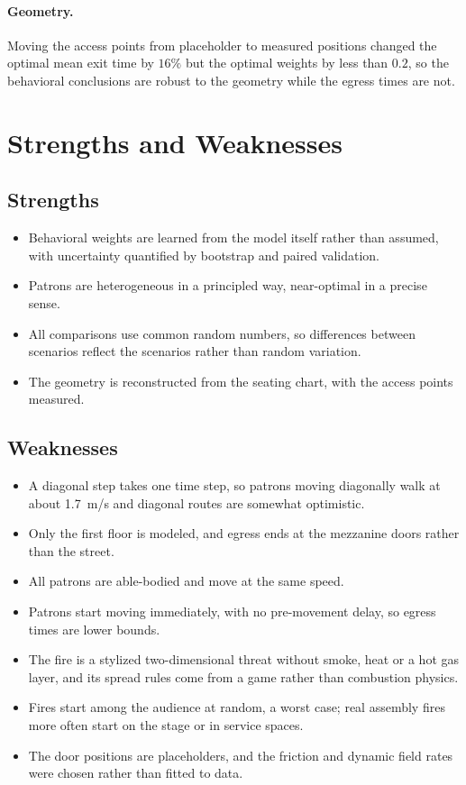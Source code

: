 \documentclass[14pt]{article}
\theoremstyle{definition}
\begin{document}
\paragraph{Geometry.} Moving the access points from placeholder to measured positions
changed the optimal mean exit time by $16\%$ but the optimal weights by less than
$0.2$, so the behavioral conclusions are robust to the geometry while the egress times
are not.

\section{Strengths and Weaknesses}
\subsection{Strengths}
\begin{itemize}
  \item Behavioral weights are learned from the model itself rather than assumed, with
  uncertainty quantified by bootstrap and paired validation.
  \item Patrons are heterogeneous in a principled way, near-optimal in a precise sense.
  \item All comparisons use common random numbers, so differences between scenarios
  reflect the scenarios rather than random variation.
  \item The geometry is reconstructed from the seating chart, with the access points
  measured.
\end{itemize}
\subsection{Weaknesses}
\begin{itemize}
  \item A diagonal step takes one time step, so patrons moving diagonally walk at about
  \SI{1.7}{m/s} and diagonal routes are somewhat optimistic.
  \item Only the first floor is modeled, and egress ends at the mezzanine doors rather
  than the street.
  \item All patrons are able-bodied and move at the same speed.
  \item Patrons start moving immediately, with no pre-movement delay, so egress times
  are lower bounds.
  \item The fire is a stylized two-dimensional threat without smoke, heat or a hot gas
  layer, and its spread rules come from a game rather than combustion physics.
  \item Fires start among the audience at random, a worst case; real assembly fires
  more often start on the stage or in service spaces.
  \item The door positions are placeholders, and the friction and dynamic field rates
  were chosen rather than fitted to data.
\end{itemize}
\end{document}
